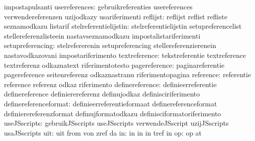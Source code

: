                                   impostapulsanti
                   usereferences: gebruikreferenties               usereferences
                                  verwendereferenzen               uzijodkazy
                                  usariferimenti
                        reflijst: reflijst                         reflist
                                  refliste                         seznamodkazu
                                  listarif
           stelreferentielijstin: stelreferentielijstin            setupreferencelist
                                  stellereferenzlisteein           nastavseznamodkazu
                                  impostalistariferimenti
                setupreferencing: stelrefererenin                  setupreferencing
                                  stellereferenzierenein           nastavodkazovani
                                  impostariferimento
                   textreference: tekstreferentie                  textreference
                                  textreferenz                     odkaznatext
                                  riferimentotesto
                   pagereference: paginareferentie                 pagereference
                                  seitenreferenz                   odkaznastranu
                                  riferimentopagina
                       reference: referentie                       reference
                                  referenz                         odkaz
                                  riferimento
                 definereference: definieerreferentie              definereference
                                  definierereferenz                definujodkaz
                                  definisciriferimento
           definereferenceformat: definieerreferentieformaat       definereferenceformat
                                  definierereferenzformat          definujformatodkazu
                                  definisciformatoriferimento
                    useJSscripts: gebruikJSscripts                 useJSscripts
                                  verwendeJSscript                 uzijJSscripts
                                  usaJSscripts
                             uit: uit                              from
                                  von                              zref
                                  da
                              in: in                               in
                                  in                               tref
                                  in
                              op: op                               at
